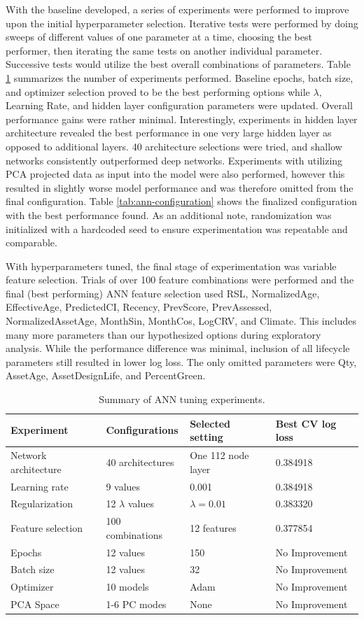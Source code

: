 \documentclass[NewProceedings,letterpaper,NoPageNumbers,NoLineNumbers, DoubleSpace]{ascelike-new}
\begin{document}
With the baseline developed, a series of experiments were performed to improve upon the initial hyperparameter selection.  Iterative tests were performed by doing sweeps of different values of one parameter at a time, choosing the best performer, then iterating the same tests on another individual parameter.  Successive tests would utilize the best overall combinations of parameters.  Table \ref{tab:ann-tuning} summarizes the number of experiments performed.  Baseline epochs, batch size, and optimizer selection proved to be the best performing options while $\lambda$, Learning Rate, and hidden layer configuration parameters were updated.  Overall performance gains were rather minimal.  Interestingly, experiments in hidden layer architecture revealed the best performance in one very large hidden layer as opposed to additional layers. 40 architecture selections were tried, and shallow networks consistently outperformed deep networks. Experiments with utilizing PCA projected data as input into the model were also performed, however this resulted in slightly worse model performance and was therefore omitted from the final configuration. Table \ref{tab:ann-configuration} shows the finalized configuration with the best performance found.  As an additional note, randomization was initialized with a hardcoded seed to ensure experimentation was repeatable and comparable.

With hyperparameters tuned, the final stage of experimentation was variable feature selection. Trials of over 100 feature combinations were performed and the final (best performing) ANN feature selection used RSL, NormalizedAge, EffectiveAge, PredictedCI, Recency, PrevScore, PrevAssessed, NormalizedAssetAge, MonthSin, MonthCos, LogCRV, and Climate. This includes many more parameters than our hypothesized options during exploratory analysis.  While the performance difference was minimal, inclusion of all lifecycle parameters still resulted in lower log loss. The only omitted parameters were Qty, AssetAge, AssetDesignLife, and PercentGreen. 

\begin{table}[htbp]
\centering
\caption{Summary of ANN tuning experiments.}
\label{tab:ann-tuning}
\begin{tabular}{llll}
\hline
\textbf{Experiment} & \textbf{Configurations} & \textbf{Selected setting} & \textbf{Best CV log loss} \\
\hline
Network architecture & 40 architectures & One 112 node layer & 0.384918 \\
Learning rate & 9 values & 0.001 & 0.384918 \\
Regularization & 12 $\lambda$ values & $\lambda = 0.01$ & 0.383320 \\
Feature selection & 100 combinations & 12 features & 0.377854 \\
Epochs & 12 values & 150 & No Improvement \\
Batch size & 12 values & 32 & No Improvement \\
Optimizer & 10 models & Adam & No Improvement \\
PCA Space & 1-6 PC modes & None & No Improvement \\
\hline
\end{tabular}
\end{table}
\end{document}
